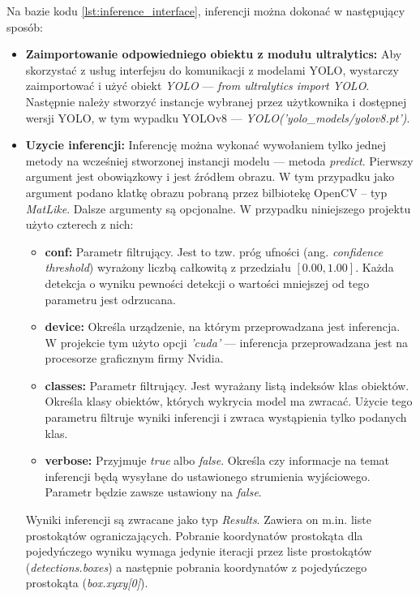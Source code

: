 Na bazie kodu \ref{lst:inference_interface}, inferencji można dokonać w następujący sposób:
\begin{itemize}
    \item \textbf{Zaimportowanie odpowiedniego obiektu z modułu ultralytics:} Aby skorzystać z usług interfejsu do komunikacji z modelami YOLO, wystarczy zaimportować i użyć obiekt \emph{YOLO} --- \emph{from ultralytics import YOLO}. Następnie należy stworzyć instancje wybranej przez użytkownika i dostępnej wersji YOLO, w tym wypadku YOLOv8 --- \emph{YOLO('yolo\_models/yolov8.pt')}.

    \item \textbf{Uzycie inferencji:} Inferencję można wykonać wywołaniem tylko jednej metody na wcześniej stworzonej instancji modelu --- metoda \emph{predict}. Pierwszy argument jest obowiązkowy i jest źródłem obrazu. W tym przypadku jako argument podano klatkę obrazu pobraną przez bilbiotekę OpenCV -- typ \emph{MatLike}. Dalsze argumenty są opcjonalne. W przypadku niniejszego projektu użyto czterech z nich:
    \begin{itemize}
        \item \textbf{conf:} Parametr filtrujący. Jest to tzw. próg ufności (ang. \emph{confidence threshold}) wyrażony liczbą całkowitą z przedziału $[0.00, 1.00]$. Każda detekcja o wyniku pewności detekcji o wartości mniejszej od tego parametru jest odrzucana. 
        \item \textbf{device:} Określa urządzenie, na którym przeprowadzana jest inferencja. W projekcie tym użyto opcji \emph{'cuda'} --- inferencja przeprowadzana jest na procesorze graficznym firmy Nvidia.
        \item \textbf{classes:} Parametr filtrujący. Jest wyrażany listą indeksów klas obiektów. Określa klasy obiektów, których wykrycia model ma zwracać.
        Użycie tego parametru filtruje wyniki inferencji i zwraca wystąpienia tylko podanych klas. 
        \item \textbf{verbose:} Przyjmuje \emph{true} albo \emph{false}. Określa czy informacje na temat inferencji będą wysyłane do ustawionego strumienia wyjściowego. Parametr będzie zawsze ustawiony na \emph{false}.
    \end{itemize}
    Wyniki inferencji są zwracane jako typ \emph{Results}. Zawiera on m.in. liste prostokątów ograniczających. Pobranie koordynatów prostokąta dla pojedyńczego wyniku wymaga jedynie iteracji przez liste prostokątów (\emph{detections.boxes}) a następnie pobrania koordynatów z pojedyńczego prostokąta (\emph{box.xyxy[0]}).
\end{itemize}

